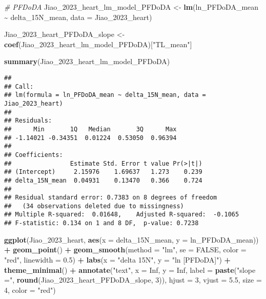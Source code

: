 \documentclass[
]{article}
\newenvironment{Shaded}{\begin{snugshade}}{\end{snugshade}}
\newcommand{\AttributeTok}[1]{\textcolor[rgb]{0.13,0.29,0.53}{#1}}
\newcommand{\CommentTok}[1]{\textcolor[rgb]{0.56,0.35,0.01}{\textit{#1}}}
\newcommand{\ConstantTok}[1]{\textcolor[rgb]{0.56,0.35,0.01}{#1}}
\newcommand{\DecValTok}[1]{\textcolor[rgb]{0.00,0.00,0.81}{#1}}
\newcommand{\FloatTok}[1]{\textcolor[rgb]{0.00,0.00,0.81}{#1}}
\newcommand{\FunctionTok}[1]{\textcolor[rgb]{0.13,0.29,0.53}{\textbf{#1}}}
\newcommand{\NormalTok}[1]{#1}
\newcommand{\OtherTok}[1]{\textcolor[rgb]{0.56,0.35,0.01}{#1}}
\newcommand{\SpecialCharTok}[1]{\textcolor[rgb]{0.81,0.36,0.00}{\textbf{#1}}}
\newcommand{\StringTok}[1]{\textcolor[rgb]{0.31,0.60,0.02}{#1}}
\begin{document}
\begin{Shaded}
\begin{Highlighting}[]
\CommentTok{\# PFDoDA}
\NormalTok{Jiao\_2023\_heart\_lm\_model\_PFDoDA }\OtherTok{\textless{}{-}} \FunctionTok{lm}\NormalTok{(ln\_PFDoDA\_mean }\SpecialCharTok{\textasciitilde{}}\NormalTok{ delta\_15N\_mean,}
                                    \AttributeTok{data =}\NormalTok{ Jiao\_2023\_heart)}

\NormalTok{Jiao\_2023\_heart\_PFDoDA\_slope }\OtherTok{\textless{}{-}} \FunctionTok{coef}\NormalTok{(Jiao\_2023\_heart\_lm\_model\_PFDoDA)[}\StringTok{"TL\_mean"}\NormalTok{]}

\FunctionTok{summary}\NormalTok{(Jiao\_2023\_heart\_lm\_model\_PFDoDA)}
\end{Highlighting}
\end{Shaded}

\begin{verbatim}
## 
## Call:
## lm(formula = ln_PFDoDA_mean ~ delta_15N_mean, data = Jiao_2023_heart)
## 
## Residuals:
##      Min       1Q   Median       3Q      Max 
## -1.14021 -0.34351  0.01224  0.53050  0.96394 
## 
## Coefficients:
##                Estimate Std. Error t value Pr(>|t|)
## (Intercept)     2.15976    1.69637   1.273    0.239
## delta_15N_mean  0.04931    0.13470   0.366    0.724
## 
## Residual standard error: 0.7383 on 8 degrees of freedom
##   (34 observations deleted due to missingness)
## Multiple R-squared:  0.01648,    Adjusted R-squared:  -0.1065 
## F-statistic: 0.134 on 1 and 8 DF,  p-value: 0.7238
\end{verbatim}

\begin{Shaded}
\begin{Highlighting}[]
\FunctionTok{ggplot}\NormalTok{(Jiao\_2023\_heart, }\FunctionTok{aes}\NormalTok{(}\AttributeTok{x =}\NormalTok{ delta\_15N\_mean, }\AttributeTok{y =}\NormalTok{ ln\_PFDoDA\_mean)) }\SpecialCharTok{+}
  \FunctionTok{geom\_point}\NormalTok{() }\SpecialCharTok{+}
  \FunctionTok{geom\_smooth}\NormalTok{(}\AttributeTok{method =} \StringTok{"lm"}\NormalTok{, }\AttributeTok{se =} \ConstantTok{FALSE}\NormalTok{, }\AttributeTok{color =} \StringTok{"red"}\NormalTok{, }\AttributeTok{linewidth =} \FloatTok{0.5}\NormalTok{) }\SpecialCharTok{+}
  \FunctionTok{labs}\NormalTok{(}\AttributeTok{x =} \StringTok{"delta 15N"}\NormalTok{,}
       \AttributeTok{y =} \StringTok{"ln [PFDoDA]"}\NormalTok{) }\SpecialCharTok{+}
  \FunctionTok{theme\_minimal}\NormalTok{() }\SpecialCharTok{+}
  \FunctionTok{annotate}\NormalTok{(}\StringTok{"text"}\NormalTok{, }\AttributeTok{x =} \ConstantTok{Inf}\NormalTok{, }\AttributeTok{y =} \ConstantTok{Inf}\NormalTok{, }\AttributeTok{label =} \FunctionTok{paste}\NormalTok{(}\StringTok{"slope ="}\NormalTok{, }\FunctionTok{round}\NormalTok{(Jiao\_2023\_heart\_PFDoDA\_slope, }\DecValTok{3}\NormalTok{)), }
           \AttributeTok{hjust =} \DecValTok{3}\NormalTok{, }\AttributeTok{vjust =} \FloatTok{5.5}\NormalTok{, }\AttributeTok{size =} \DecValTok{4}\NormalTok{, }\AttributeTok{color =} \StringTok{"red"}\NormalTok{)}
\end{Highlighting}
\end{Shaded}
\end{document}
